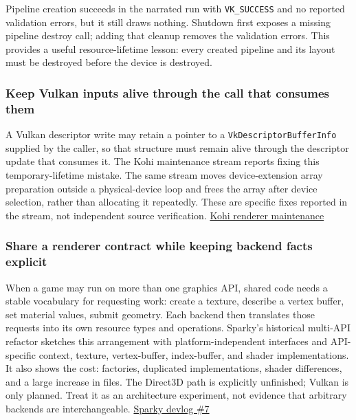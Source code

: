 Pipeline creation succeeds in the narrated run with \texttt{VK\_SUCCESS} and no reported validation errors, but it still draws nothing. Shutdown first exposes a missing pipeline destroy call; adding that cleanup removes the validation errors. This provides a useful resource-lifetime lesson: every created pipeline and its layout must be destroyed before the device is destroyed.

\subsubsection{Keep Vulkan inputs alive through the call that consumes them}\label{06-engine-ii-ch025-keep-vulkan-inputs-alive-through-the-call-that-consumes-them}

A Vulkan descriptor write may retain a pointer to a \texttt{VkDescriptorBufferInfo} supplied by the caller, so that structure must remain alive through the descriptor update that consumes it. The Kohi maintenance stream reports fixing this temporary-lifetime mistake. The same stream moves device-extension array preparation outside a physical-device loop and frees the array after device selection, rather than allocating it repeatedly. These are specific fixes reported in the stream, not independent source verification. \href{https://www.youtube.com/watch?v=x8ao57nbMlY}{Kohi renderer maintenance}

\subsubsection{Share a renderer contract while keeping backend facts explicit}\label{06-engine-ii-ch025-share-a-renderer-contract-while-keeping-backend-facts-explicit}

When a game may run on more than one graphics API, shared code needs a stable vocabulary for requesting work: create a texture, describe a vertex buffer, set material values, submit geometry. Each backend then translates those requests into its own resource types and operations. Sparky's historical multi-API refactor sketches this arrangement with platform-independent interfaces and API-specific context, texture, vertex-buffer, index-buffer, and shader implementations. It also shows the cost: factories, duplicated implementations, shader differences, and a large increase in files. The Direct3D path is explicitly unfinished; Vulkan is only planned. Treat it as an architecture experiment, not evidence that arbitrary backends are interchangeable. \href{https://www.youtube.com/watch?v=yGggmfDGGv0&t=2m43s}{Sparky devlog \#7}

